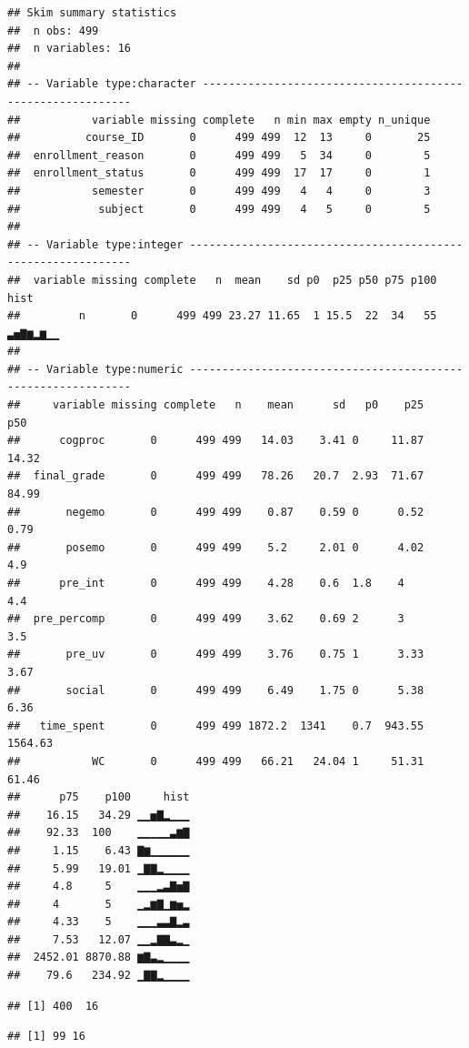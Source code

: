 \documentclass[]{apa6}
\theoremstyle{definition}
\theoremstyle{definition}
\theoremstyle{definition}
\theoremstyle{remark}
\begin{document}
\begin{verbatim}
## Skim summary statistics
##  n obs: 499 
##  n variables: 16 
## 
## -- Variable type:character -----------------------------------------------------------
##           variable missing complete   n min max empty n_unique
##          course_ID       0      499 499  12  13     0       25
##  enrollment_reason       0      499 499   5  34     0        5
##  enrollment_status       0      499 499  17  17     0        1
##           semester       0      499 499   4   4     0        3
##            subject       0      499 499   4   5     0        5
## 
## -- Variable type:integer -------------------------------------------------------------
##  variable missing complete   n  mean    sd p0  p25 p50 p75 p100     hist
##         n       0      499 499 23.27 11.65  1 15.5  22  34   55 ▃▅▇▆▂▆▁▁
## 
## -- Variable type:numeric -------------------------------------------------------------
##     variable missing complete   n    mean      sd   p0    p25     p50
##      cogproc       0      499 499   14.03    3.41 0     11.87   14.32
##  final_grade       0      499 499   78.26   20.7  2.93  71.67   84.99
##       negemo       0      499 499    0.87    0.59 0      0.52    0.79
##       posemo       0      499 499    5.2     2.01 0      4.02    4.9 
##      pre_int       0      499 499    4.28    0.6  1.8    4       4.4 
##  pre_percomp       0      499 499    3.62    0.69 2      3       3.5 
##       pre_uv       0      499 499    3.76    0.75 1      3.33    3.67
##       social       0      499 499    6.49    1.75 0      5.38    6.36
##   time_spent       0      499 499 1872.2  1341    0.7  943.55 1564.63
##           WC       0      499 499   66.21   24.04 1     51.31   61.46
##      p75    p100     hist
##    16.15   34.29 ▁▁▅▇▂▁▁▁
##    92.33  100    ▁▁▁▁▁▃▆▇
##     1.15    6.43 ▇▆▁▁▁▁▁▁
##     5.99   19.01 ▁▇▇▂▁▁▁▁
##     4.8     5    ▁▁▁▂▃▇▅▇
##     4       5    ▁▂▆▇▁▆▅▂
##     4.33    5    ▁▁▁▃▃▇▂▃
##     7.53   12.07 ▁▁▂▇▇▃▂▁
##  2452.01 8870.88 ▆▇▃▂▁▁▁▁
##    79.6   234.92 ▁▇▇▂▁▁▁▁
\end{verbatim}

\begin{verbatim}
## [1] 400  16
\end{verbatim}

\begin{verbatim}
## [1] 99 16
\end{verbatim}
\end{document}
